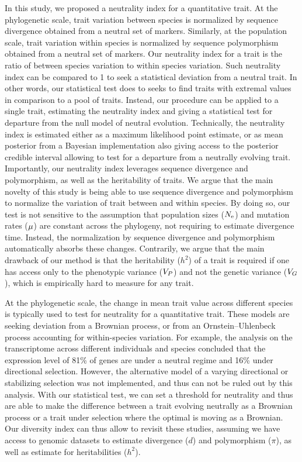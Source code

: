 \documentclass{article}
\begin{document}
In this study, we proposed a neutrality index for a quantitative trait.
At the phylogenetic scale, trait variation between species is normalized by sequence divergence obtained from a neutral set of markers.
Similarly, at the population scale, trait variation within species is normalized by sequence polymorphism obtained from a neutral set of markers.
Our neutrality index for a trait is the ratio of between species variation to within species variation.
Such neutrality index can be compared to 1 to seek a statistical deviation from a neutral trait.
In other words, our statistical test does to seeks to find traits with extremal values in comparison to a pool of traits.
Instead, our procedure can be applied to a single trait, estimating the neutrality index and giving a statistical test for departure from the null model of neutral evolution.
Technically, the neutrality index is estimated either as a maximum likelihood point estimate, or as mean posterior from a Bayesian implementation also giving access to the posterior credible interval allowing to test for a departure from a neutrally evolving trait.
Importantly, our neutrality index leverages sequence divergence and polymorphism, as well as the heritability of traits.
We argue that the main novelty of this study is being able to use sequence divergence and polymorphism to normalize the variation of trait between and within species.
By doing so, our test is not sensitive to the assumption that population sizes ($N_{\text{e}}$) and mutation rates ($\mu$) are constant across the phylogeny, not requiring to estimate divergence time\cite{litsios_effects_2012}.
Instead, the normalization by sequence divergence and polymorphism automatically absorbs these changes\cite{seo_estimating_2004}.
Contrarily, we argue that the main drawback of our method is that the heritability ($h^2$) of a trait is required if one has access only to the phenotypic variance ($V_{P}$) and not the genetic variance ($V_{G}$), which is empirically hard to measure for any trait.

At the phylogenetic scale, the change in mean trait value across different species is typically used to test for neutrality for a quantitative trait.
These models are seeking deviation from a Brownian process\cite{catalan_drift_2019}, or from an Ornstein–Uhlenbeck process accounting for within-species variation\cite{rohlfs_phylogenetic_2015}.
For example, the analysis on the transcriptome across different individuals and species concluded that the expression level of 81\% of genes are under a neutral regime and 16\% under directional selection\cite{catalan_drift_2019}.
However, the alternative model of a varying directional or stabilizing selection was not implemented, and thus can not be ruled out by this analysis.
With our statistical test, we can set a threshold for neutrality and thus are able to make the difference between a trait evolving neutrally as a Brownian process or a trait under selection where the optimal is moving as a Brownian.
Our diversity index can thus allow to revisit these studies, assuming we have access to genomic datasets to estimate divergence ($d$) and polymorphism ($\pi$), as well as estimate for heritabilities ($h^2$).
\end{document}
